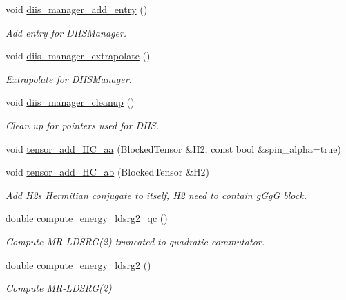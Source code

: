 \begin{DoxyCompactItemize}
void \mbox{\hyperlink{classforte_1_1_m_r_d_s_r_g_af70cafb6763cb557d0be82d437f79584}{diis\+\_\+manager\+\_\+add\+\_\+entry}} ()
\begin{DoxyCompactList}\small\item\em Add entry for D\+I\+I\+S\+Manager. \end{DoxyCompactList}\item 
void \mbox{\hyperlink{classforte_1_1_m_r_d_s_r_g_aeca89f359b5879c11080ddb061d13775}{diis\+\_\+manager\+\_\+extrapolate}} ()
\begin{DoxyCompactList}\small\item\em Extrapolate for D\+I\+I\+S\+Manager. \end{DoxyCompactList}\item 
void \mbox{\hyperlink{classforte_1_1_m_r_d_s_r_g_a56c8b9a8ad290ca4b238537dcc056114}{diis\+\_\+manager\+\_\+cleanup}} ()
\begin{DoxyCompactList}\small\item\em Clean up for pointers used for D\+I\+IS. \end{DoxyCompactList}\item 
void \mbox{\hyperlink{classforte_1_1_m_r_d_s_r_g_a8f5c4968750ec9df1331fa8043e80b12}{tensor\+\_\+add\+\_\+\+H\+C\+\_\+aa}} (Blocked\+Tensor \&H2, const bool \&spin\+\_\+alpha=true)
\item 
void \mbox{\hyperlink{classforte_1_1_m_r_d_s_r_g_a4da8f09da9338f40ab2e02dcd2987763}{tensor\+\_\+add\+\_\+\+H\+C\+\_\+ab}} (Blocked\+Tensor \&H2)
\begin{DoxyCompactList}\small\item\em Add H2\textquotesingle{}s Hermitian conjugate to itself, H2 need to contain g\+GgG block. \end{DoxyCompactList}\item 
double \mbox{\hyperlink{classforte_1_1_m_r_d_s_r_g_a25ac2cae81724f6082fe690f240410ed}{compute\+\_\+energy\+\_\+ldsrg2\+\_\+qc}} ()
\begin{DoxyCompactList}\small\item\em Compute M\+R-\/\+L\+D\+S\+RG(2) truncated to quadratic commutator. \end{DoxyCompactList}\item 
double \mbox{\hyperlink{classforte_1_1_m_r_d_s_r_g_a35415fcbb3e8073bb7ab0e4407ec531a}{compute\+\_\+energy\+\_\+ldsrg2}} ()
\begin{DoxyCompactList}\small\item\em Compute M\+R-\/\+L\+D\+S\+RG(2) \end{DoxyCompactList}\item 

\end{DoxyCompactItemize}
